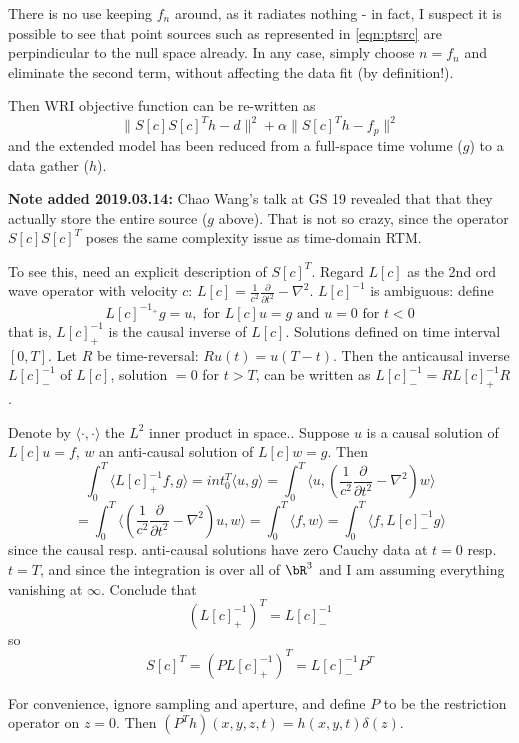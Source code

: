 There is no use keeping $f_n$ around, as it radiates nothing - in fact, I suspect it is possible to see that point sources such as represented in \ref{eqn:ptsrc} are perpindicular to the null space already. In any case, simply choose $n=f_n$ and eliminate the second term, without affecting the data fit (by definition!).

Then WRI objective function can be re-written as
\begin{equation}
\label{eqn:wriobj}
\|S[c]S[c]^Th-d\|^2 + \alpha \|S[c]^Th -f_p\|^2
\end{equation}
and the extended model has been reduced from a full-space time volume ($g$) to a data gather ($h$).

{\bf Note added 2019.03.14:} Chao Wang's talk at GS 19 revealed that that they actually store the entire source ($g$ above). That is not so crazy, since the operator $S[c]S[c]^T$ poses the same complexity issue as time-domain RTM. 

To see this, need an explicit description of $S[c]^T$. Regard $L[c]$ as the 2nd ord wave operator with velocity $c$: $L[c]=\frac{1}{c^2}\frac{\partial}{\partial t^2} - \nabla^2$. $L[c]^{-1}$ is ambiguous: define 
\[
L[c]^{-1_+}g = u, \mbox{ for } L[c]u=g \mbox{ and } u=0 \mbox{ for } t<0
\]
that is, $L[c]^{-1}_+$ is the causal inverse of $L[c]$. Solutions defined on time interval $[0,T]$. Let $R$ be time-reversal: $Ru(t)=u(T-t)$. Then the anticausal inverse $L[c]^{-1}_-$ of $L[c]$, solution $=0$ for $t>T$, can be written as $L[c]^{-1}_- = RL[c]^{-1}_+R$.

Denote by $\langle \cdot,\cdot \rangle$ the $L^2$ inner product in space.. Suppose $u$ is a causal solution of $L[c]u=f$, $w$ an anti-causal solution of $L[c]w=g$. Then 
\[
\int_0^T \langle L[c]^{-1}_+f, g \rangle = int_0^T \langle u, g \rangle = \int_0^T \langle u, \left( \frac{1}{c^2}\frac{\partial}{\partial t^2} - \nabla^2\right)w\rangle
\]
\[
= \int_0^T \langle \left( \frac{1}{c^2}\frac{\partial}{\partial t^2} - \nabla^2\right)u, w \rangle = \int_0^T \langle f, w \rangle = \int_0^T \langle f, L[c]^{-1}_-g \rangle
\]
since the causal resp. anti-causal solutions have zero Cauchy data at $t=0$ resp. $t=T$, and since the integration is over all of $\bR^3$ and I am assuming everything vanishing at $\infty$. Conclude that
\[
(L[c]^{-1}_+)^T = L[c]^{-1}_-
\]
so
\[
S[c]^T = (PL[c]^{-1}_+)^T = L[c]^{-1}_-P^T
\]

For convenience, ignore sampling and aperture, and define $P$ to be the restriction operator on $z=0$. Then $(P^T h)(x,y,z,t) = h(x,y,t)\delta(z)$.

